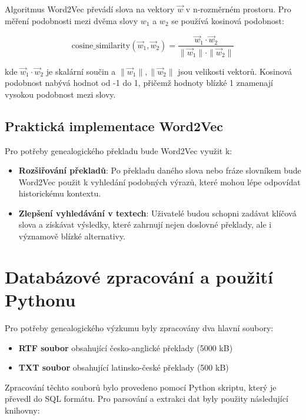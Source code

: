 \documentclass[czech, ba, kiv, he]{fasthesis}
\begin{document}
Algoritmus Word2Vec převádí slova na vektory \( \vec{w} \) v n-rozměrném prostoru. Pro měření podobnosti mezi dvěma slovy \( w_1 \) a \( w_2 \) se používá kosinová podobnost:  

\begin{equation}  
\mathrm{cosine\_similarity}(\vec{w}_1, \vec{w}_2) = \frac{\vec{w}_1 \cdot \vec{w}_2}{\|\vec{w}_1\| \cdot \|\vec{w}_2\|}  
\end{equation}  

kde \( \vec{w}_1 \cdot \vec{w}_2 \) je skalární součin a \( \|\vec{w}_1\|, \|\vec{w}_2\| \) jsou velikosti vektorů. Kosinová podobnost nabývá hodnot od -1 do 1, přičemž hodnoty blízké 1 znamenají vysokou podobnost mezi slovy.  

\subsection{Praktická implementace Word2Vec}  

Pro potřeby genealogického překladu bude Word2Vec využit k:  

\begin{itemize}  
    \item \textbf{Rozšiřování překladů}: Po překladu daného slova nebo fráze slovníkem bude Word2Vec použit k vyhledání podobných výrazů, které mohou lépe odpovídat historickému kontextu.  
    \item \textbf{Zlepšení vyhledávání v textech}: Uživatelé budou schopni zadávat klíčová slova a získávat výsledky, které zahrnují nejen doslovné překlady, ale i významově blízké alternativy.  
\end{itemize}  

\section{Databázové zpracování a použití Pythonu}  

Pro potřeby genealogického výzkumu byly zpracovány dva hlavní soubory:  

\begin{itemize}  
    \item \textbf{RTF soubor} obsahující česko-anglické překlady (5000 kB)  
    \item \textbf{TXT soubor} obsahující latinsko-české překlady (500 kB)  
\end{itemize}  

Zpracování těchto souborů bylo provedeno pomocí Python skriptu, který je převedl do SQL formátu. Pro parsování a extrakci dat byly použity následující knihovny:  
\end{document}
